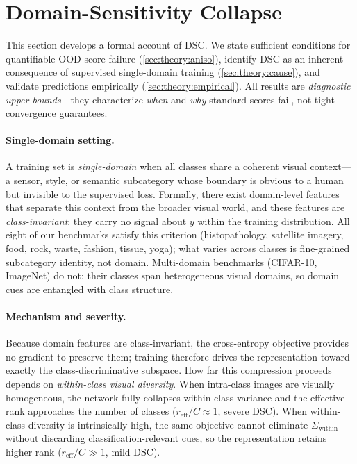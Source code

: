 \documentclass[runningheads]{llncs}
\begin{document}
\section{Domain-Sensitivity Collapse}
\label{sec:theory}

This section develops a formal account of DSC.
We state sufficient conditions for quantifiable OOD-score failure (\cref{sec:theory:aniso}), identify DSC as an inherent consequence of supervised single-domain training (\cref{sec:theory:cause}), and validate predictions empirically (\cref{sec:theory:empirical}).
All results are \emph{diagnostic upper bounds}---they characterize \emph{when} and \emph{why} standard scores fail, not tight convergence guarantees.

\paragraph{Single-domain setting.}
A training set is \emph{single-domain} when all classes share a coherent visual context---a sensor, style, or semantic subcategory whose boundary is obvious to a human but invisible to the supervised loss.
Formally, there exist domain-level features that separate this context from the broader visual world, and these features are \emph{class-invariant}: they carry no signal about $y$ within the training distribution.
All eight of our benchmarks satisfy this criterion (histopathology, satellite imagery, food, rock, waste, fashion, tissue, yoga); what varies across classes is fine-grained subcategory identity, not domain.
Multi-domain benchmarks (CIFAR-10, ImageNet) do not: their classes span heterogeneous visual domains, so domain cues are entangled with class structure.

\paragraph{Mechanism and severity.}
Because domain features are class-invariant, the cross-entropy objective provides no gradient to preserve them; training therefore drives the representation toward exactly the class-discriminative subspace.
How far this compression proceeds depends on \emph{within-class visual diversity}.
When intra-class images are visually homogeneous, the network fully collapses within-class variance and the effective rank approaches the number of classes ($r_{\mathrm{eff}}/C \approx 1$, severe DSC).
When within-class diversity is intrinsically high, the same objective cannot eliminate $\Sigma_{\mathrm{within}}$ without discarding classification-relevant cues, so the representation retains higher rank ($r_{\mathrm{eff}}/C \gg 1$, mild DSC).
\end{document}
